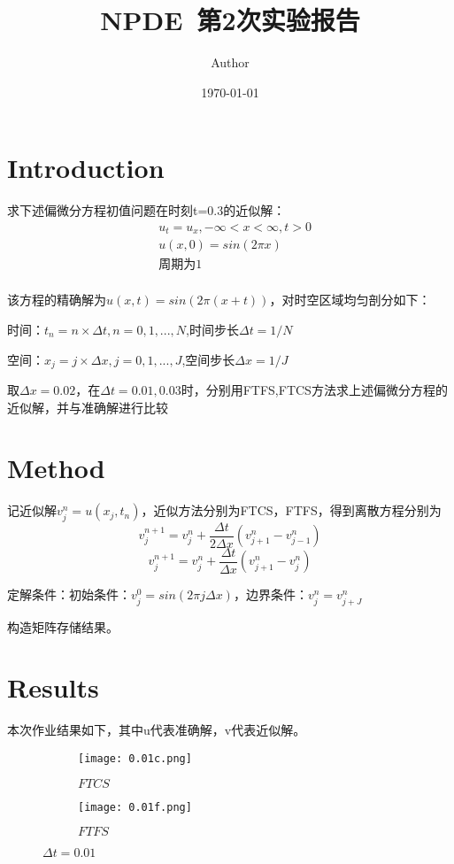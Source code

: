 \documentclass{article}
\title{NPDE~第2次实验报告}
\author{Author}
\date{\today}
\begin{document}
\maketitle

\section{Introduction}

求下述偏微分方程初值问题在时刻t=0.3的近似解：
$$
\begin{aligned}
  & u_t=u_x,-\infty<x<\infty,t>0 \\
  & u(x,0)=sin(2\pi x)           \\
  & \text{周期为1}                  \\
\end{aligned}
$$

该方程的精确解为$u(x,t)=sin(2\pi(x+t))$，对时空区域均匀剖分如下：

时间：$t_n=n\times \Delta t,n=0,1,...,N$,时间步长$\Delta t=1/N$

空间：$x_j=j\times \Delta x,j=0,1,...,J$,空间步长$\Delta x=1/J$

取$\Delta x =0.02$，在$\Delta t=0.01,0.03$时，分别用FTFS,FTCS方法求上述偏微分方程的近似解，并与准确解进行比较
\section{Method}

记近似解$v_j^n=u(x_j,t_n)$，近似方法分别为FTCS，FTFS，得到离散方程分别为
$$v_j^{n+1}=v_j^n+\frac{\Delta t}{2\Delta x}(v_{j+1}^n-v_{j-1}^n)$$
$$v_j^{n+1}=v_j^n+\frac{\Delta t}{\Delta x}(v_{j+1}^n-v_{j}^n)$$

定解条件：初始条件：$v_j^0=sin(2\pi j\Delta x)$，边界条件：$v_j^n=v_{j+J}^n$

构造矩阵存储结果。
\section{Results}

本次作业结果如下，其中u代表准确解，v代表近似解。
\begin{figure}[H]
  \centering
  \begin{subfigure}[b]{0.47\textwidth}
    \centering
    \texttt{[image: 0.01c.png]}
    \caption{$FTCS$}

  \end{subfigure}
  \begin{subfigure}[b]{0.47\textwidth}
    \centering
    \texttt{[image: 0.01f.png]}
    \caption{$FTFS$}

  \end{subfigure}
  \caption{$\Delta t=0.01$}
\end{figure}
\end{document}

